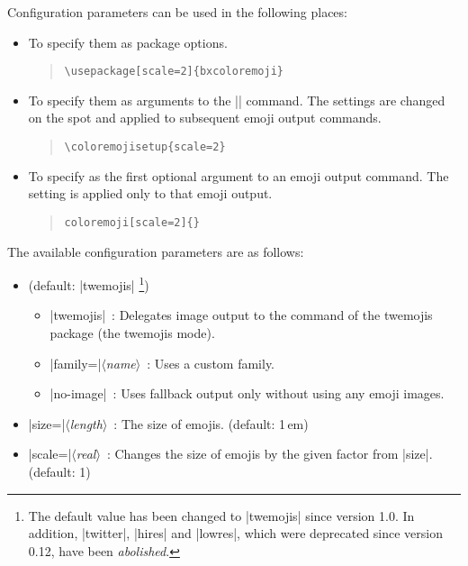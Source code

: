 \documentclass[a4paper]{article}
\newcommand{\CE}[1]{\coloremoji{#1}}
\newcommand{\Pkg}[1]{\textsf{#1}}
\newcommand{\Meta}[1]{$\langle$\textit{#1}$\rangle$}
\newcommand{\Means}{~:\quad}
\newcommand{\／}{\mbox{}／\mbox{}}
\newcommand{\cs}[1]{\symbol{`\\}#1}
\begin{document}
Configuration parameters can be used in the following places:

\begin{itemize}
\item To specify them as package options.
\begin{quote}\small\begin{verbatim}
\usepackage[scale=2]{bxcoloremoji}
\end{verbatim}\end{quote}
\item To specify them as arguments to the || command.
  The settings are changed on the spot
  and applied to subsequent emoji output commands.
\begin{quote}\small\begin{verbatim}
\coloremojisetup{scale=2}
\end{verbatim}\end{quote}
\item To specify as the first optional argument
  to an emoji output command.
  The setting is applied only to that emoji output.
\begin{quote}\small\begin{alltt}
\cs{coloremoji}[scale=2]\{\CE{☃}\}
\end{alltt}\end{quote}
\end{itemize}

The available configuration parameters are as follows:

\begin{itemize}
\item {}
  (default: |twemojis|%
  \footnote{The default value has been changed to |twemojis|
    since version 1.0.
    In addition, |twitter|, |hires| and |lowres|,
    which were deprecated since version 0.12,
    have been \emph{abolished}.})
  \begin{itemize}
  \item |twemojis|\Means
    Delegates image output to the command of the \Pkg{twemojis} package
    (the twemojis mode).
  \item |family=|\Meta{name}\Means
    Uses a custom family.
  \item |no-image|\Means
    Uses fallback output only without using any emoji images.
  \end{itemize}

\item |size=|\Meta{length}\Means
  The size of emojis. (default: 1\,em)

\item |scale=|\Meta{real}\Means
  Changes the size of emojis by the given factor
  from |size|.
  (default: 1)
\end{itemize}
\end{document}
